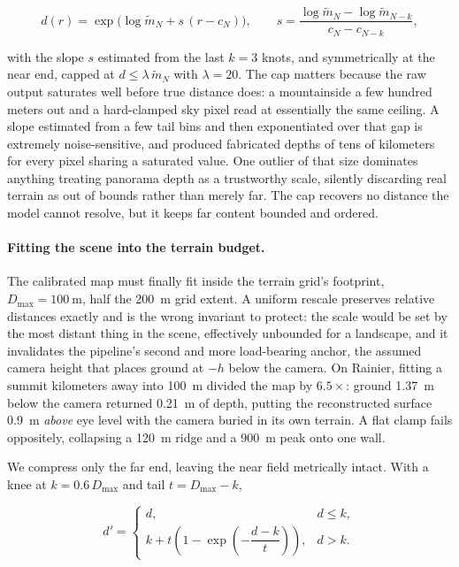 \begin{equation}
  d(r) = \exp\!\big(\log \tilde{m}_{N} + s\,(r - c_{N})\big),
  \qquad
  s = \frac{\log \tilde{m}_{N} - \log \tilde{m}_{N-k}}{c_{N} - c_{N-k}},
\end{equation}

with the slope $s$ estimated from the last $k = 3$ knots, and symmetrically at the
near end, capped at $d \le \lambda\,\tilde{m}_N$ with $\lambda = 20$. The cap
matters because the raw output saturates well before true distance does: a
mountainside a few hundred meters out and a hard-clamped sky pixel read at
essentially the same ceiling. A slope estimated from a few tail bins and then
exponentiated over that gap is extremely noise-sensitive, and produced fabricated
depths of tens of kilometers for every pixel sharing a saturated value. One
outlier of that size dominates anything treating panorama depth as a trustworthy
scale, silently discarding real terrain as out of bounds rather than merely far.
The cap recovers no distance the model cannot resolve, but it keeps far content
bounded and ordered.

\paragraph{Fitting the scene into the terrain budget.}
The calibrated map must finally fit inside the terrain grid's footprint,
$D_{\max} = \SI{100}{\meter}$, half the \SI{200}{\meter} grid extent. A uniform
rescale preserves relative distances exactly and is the wrong invariant to protect:
the scale would be set by the most distant thing in the scene, effectively unbounded
for a landscape, and it invalidates the pipeline's second and more load-bearing
anchor, the assumed camera height that places ground at $-h$ below the camera. On
Rainier, fitting a summit kilometers away into \SI{100}{\meter} divided the map by
$6.5\times$: ground \SI{1.37}{\meter} below the camera returned \SI{0.21}{\meter} of
depth, putting the reconstructed surface \SI{0.9}{\meter} \emph{above} eye level
with the camera buried in its own terrain. A flat clamp fails oppositely, collapsing
a \SI{120}{\meter} ridge and a \SI{900}{\meter} peak onto one wall.

We compress only the far end, leaving the near field metrically intact. With a knee
at $k = 0.6\,D_{\max}$ and tail $t = D_{\max} - k$,

\begin{equation}
  d' =
  \begin{cases}
    d, & d \le k, \\[2pt]
    k + t\left(1 - \exp\!\left(-\dfrac{d - k}{t}\right)\right), & d > k.
  \end{cases}
\end{equation}

